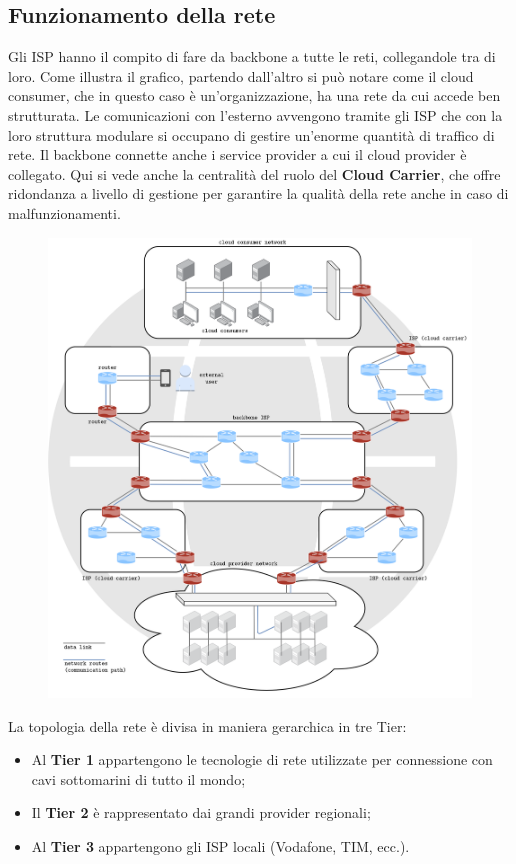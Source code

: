 \subsection{Funzionamento della rete}
Gli ISP hanno il compito di fare da backbone a tutte le reti, collegandole tra di loro. Come illustra il grafico, partendo dall'altro si può notare come il cloud consumer, che in questo caso è un'organizzazione, ha una rete da cui accede ben strutturata. Le comunicazioni con l'esterno avvengono tramite gli ISP che con la loro struttura modulare si occupano di gestire un'enorme quantità di traffico di rete. Il backbone connette anche i service provider a cui il cloud provider è collegato. Qui si vede anche la centralità del ruolo del \textbf{Cloud Carrier}, che offre ridondanza a livello di gestione per garantire la qualità della rete anche in caso di malfunzionamenti. 

\begin{figure}[ht]
    \centering
    \includegraphics[width=12cm]{./Images/cap3/3.8.png}
\end{figure}


La topologia della rete è divisa in maniera gerarchica in tre Tier:
\begin{itemize}
    \item Al \textbf{Tier 1} appartengono le tecnologie di rete utilizzate per connessione con cavi sottomarini di tutto il mondo;
    \item Il \textbf{Tier 2} è rappresentato dai grandi provider regionali;
    \item Al \textbf{Tier 3} appartengono gli ISP locali (Vodafone, TIM, ecc.).
\end{itemize}

